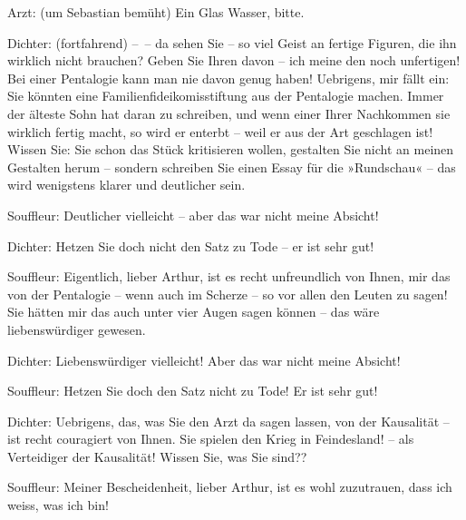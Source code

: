 \pstart
           Arzt: (um Sebastian bemüht) Ein Glas Wasser, bitte.\pend
           
\pstart
           Dichter: (fortfahrend) – – da sehen Sie – so viel Geist an fertige Figuren, die ihn
               wirklich nicht brauchen? Geben Sie Ihren davon – ich meine den noch unfertigen! Bei
               einer Pentalogie kann man nie davon genug haben! Uebrigens, mir fällt ein: Sie
               könnten eine Familienfideikomisstiftung aus der Pentalogie machen. Immer der älteste Sohn hat daran zu schreiben, und wenn einer
               Ihrer Nachkommen sie wirklich fertig macht, so wird{ }{\pb}er enterbt – weil er aus der Art
               geschlagen ist! Wissen Sie:  Sie schon das Stück
               kritisieren wollen, gestalten Sie nicht an meinen Gestalten herum – sondern schreiben
               Sie einen Essay für die »Rundschau« – das wird
               wenigstens klarer und deutlicher sein.\pend
           
\pstart
           Souffleur: Deutlicher vielleicht – aber das war nicht meine Absicht!\pend
           
\pstart
           Dichter: Hetzen Sie doch nicht den Satz zu Tode – er ist sehr gut!\pend
           
\pstart
           Souffleur: Eigentlich, lieber Arthur, ist es recht unfreundlich von Ihnen, mir das
               von der Pentalogie – wenn auch im Scherze – so vor allen den Leuten zu sagen! Sie
               hätten mir das auch unter vier Augen sagen können – das wäre liebenswürdiger
               gewesen.\pend
           
\pstart
           Dichter: Liebenswürdiger vielleicht! Aber das war nicht meine Absicht!\pend
           
\pstart
           Souffleur: Hetzen Sie doch den Satz nicht zu Tode! Er ist sehr gut!\pend
           
\pstart
           Dichter: Uebrigens, das, was Sie den Arzt da sagen lassen, von der Kausalität – ist
               recht couragiert von Ihnen. Sie spielen den Krieg in Feindesland!  – als Verteidiger der Kausalität! Wissen Sie, was Sie
               sind??\pend
           
\pstart
           Souffleur: Meiner Bescheiden\introOben{}heit\introOben{}, lieber Arthur, ist es wohl
               zuzutrauen, dass ich weiss, was ich bin!\pend
           
